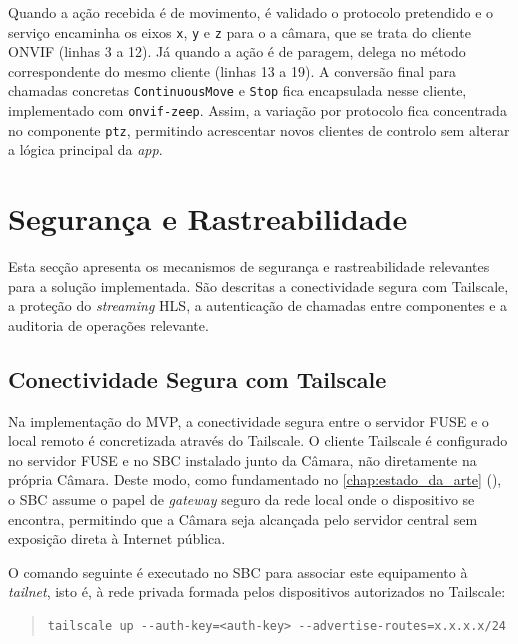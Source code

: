  Quando a ação recebida é de movimento, é validado o protocolo pretendido e o serviço encaminha os eixos \texttt{x}, \texttt{y} e \texttt{z} para o a câmara, que se trata do cliente \gls{ONVIF} (linhas 3 a 12). Já quando a ação é de paragem, delega no método correspondente do mesmo cliente (linhas 13 a 19). A conversão final para chamadas concretas \texttt{ContinuousMove} e \texttt{Stop} fica encapsulada nesse cliente, implementado com \texttt{onvif-zeep}. Assim, a variação por protocolo fica concentrada no componente \texttt{ptz}, permitindo acrescentar novos clientes de controlo sem alterar a lógica principal da \textit{app}.

\section{Segurança e Rastreabilidade}
\label{sec:seguranca_e_rastreabilidade}

Esta secção apresenta os mecanismos de segurança e rastreabilidade relevantes para a solução implementada. São descritas a conectividade segura com Tailscale, a proteção do \textit{streaming} \gls{HLS}, a autenticação de chamadas entre componentes e a auditoria de operações relevante.

\subsection{Conectividade Segura com Tailscale}

Na implementação do \gls{MVP}, a conectividade segura entre o servidor \gls{FUSE} e o local remoto é concretizada através do Tailscale. O cliente Tailscale é configurado no servidor \gls{FUSE} e no \gls{SBC} instalado junto da Câmara, não diretamente na própria Câmara. Deste modo, como fundamentado no \autoref{chap:estado_da_arte} (), o \gls{SBC} assume o papel de \textit{gateway} seguro da rede local onde o dispositivo se encontra, permitindo que a Câmara seja alcançada pelo servidor central sem exposição direta à Internet pública.

O comando seguinte é executado no \gls{SBC} para associar este equipamento à \textit{tailnet}, isto é, à rede privada formada pelos dispositivos autorizados no Tailscale:

\begin{quote}
\small
\begin{verbatim}
tailscale up --auth-key=<auth-key> --advertise-routes=x.x.x.x/24
\end{verbatim}
\end{quote}

